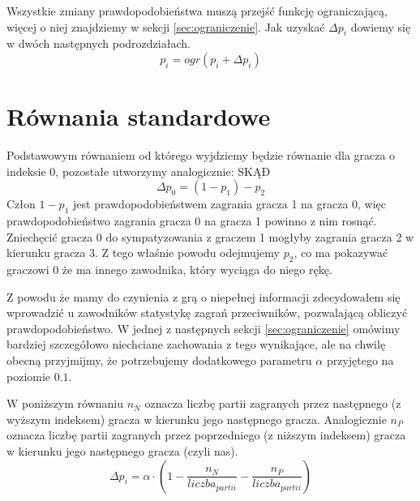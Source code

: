 Wszystkie zmiany prawdopodobieństwa muszą przejść funkcję ograniczającą, więcej o niej znajdziemy w sekcji \ref{sec:ograniczenie}. Jak uzyskać $\Delta p_i$ dowiemy się w dwóch następnych podrozdziałach.
\begin{equation} \label{eq:ograniczenie}
p_i = ogr( p_i + \Delta p_i)
\end{equation}

\section{Równania standardowe}
\label{sec:r_stand}
Podstawowym równaniem od którego wyjdziemy będzie równanie dla gracza o indeksie 0, pozostałe utworzymy analogicznie:
{\color{red} SKĄÐ}
\begin{equation} \label{eq:poczatek}
\Delta p_0 = (1 - p_1) - p_2
\end{equation}
Człon $1 - p_1$ jest prawdopodobieństwem zagrania gracza 1 na gracza 0, więc prawdopodobieństwo zagrania gracza 0 na gracza 1 powinno z nim rosnąć. Zniechęcić gracza 0 do sympatyzowania z graczem 1 mogłyby zagrania gracza 2 w kierunku gracza 3. Z tego właśnie powodu odejmujemy $p_2$, co ma pokazywać graczowi 0 że ma innego zawodnika, który wyciąga do niego rękę.

Z powodu że mamy do czynienia z grą o niepełnej informacji zdecydowałem się wprowadzić u zawodników statystykę zagrań przeciwników, pozwalającą obliczyć prawdopodobieństwo. W jednej z następnych sekcji \ref{sec:ograniczenie} omówimy bardziej szczegółowo niechciane zachowania z tego wynikające, ale na chwilę obecną przyjmijmy, że potrzebujemy dodatkowego parametru $\alpha$ przyjętego na poziomie $0.1$.

W poniższym równaniu $n_N$ oznacza liczbę partii zagranych przez następnego (z wyższym indeksem) gracza w kierunku jego następnego gracza. Analogicznie $n_P$ oznacza liczbę partii zagranych przez poprzedniego (z niższym indeksem) gracza w kierunku jego następnego gracza (czyli nas).
\begin{equation} \label{eq:stand}
\Delta p_i = \alpha \cdot (1 - \frac{n_N}{liczba_{partii}} - \frac{n_P}{liczba_{partii}})
\end{equation}


